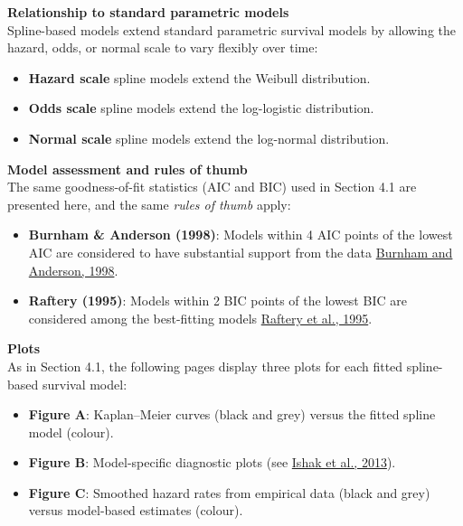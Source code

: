 \documentclass[
]{article}
\providecommand{\tightlist}{%
  \setlength{\itemsep}{0pt}\setlength{\parskip}{0pt}}
\begin{document}
\textbf{Relationship to standard parametric models}\\
Spline-based models extend standard parametric survival models by
allowing the hazard, odds, or normal scale to vary flexibly over time:

\begin{itemize}
\tightlist
\item
  \textbf{Hazard scale} spline models extend the Weibull distribution.\\
\item
  \textbf{Odds scale} spline models extend the log-logistic
  distribution.\\
\item
  \textbf{Normal scale} spline models extend the log-normal
  distribution.
\end{itemize}

\textbf{Model assessment and rules of thumb}\\
The same goodness-of-fit statistics (AIC and BIC) used in Section 4.1
are presented here, and the same \emph{rules of thumb} apply:

\begin{itemize}
\tightlist
\item
  \textbf{Burnham \& Anderson (1998)}: Models within 4 AIC points of the
  lowest AIC are considered to have substantial support from the data
  \href{https://doi.org/10.1007/978-1-4757-2917-7}{Burnham and Anderson,
  1998}.\\
\item
  \textbf{Raftery (1995)}: Models within 2 BIC points of the lowest BIC
  are considered among the best-fitting models
  \href{https://doi.org/10.2307/271063}{Raftery et al., 1995}.
\end{itemize}

\textbf{Plots}\\
As in Section 4.1, the following pages display three plots for each
fitted spline-based survival model:

\begin{itemize}
\tightlist
\item
  \textbf{Figure A}: Kaplan--Meier curves (black and grey) versus the
  fitted spline model (colour).\\
\item
  \textbf{Figure B}: Model-specific diagnostic plots (see
  \href{https://doi.org/10.1007/s40273-013-0064-3}{Ishak et al.,
  2013}).\\
\item
  \textbf{Figure C}: Smoothed hazard rates from empirical data (black
  and grey) versus model-based estimates (colour).
\end{itemize}
\end{document}
